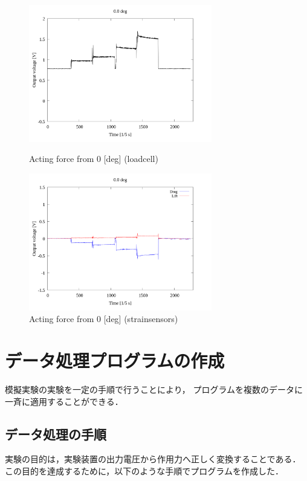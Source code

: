 \documentclass[twocolumn,a4j]{jsarticle}
\begin{document}
\begin{figure}[htbp]
    \footnotesize
    \begin{center}
        \includegraphics[width=80mm]{../images_2/01-1_loadcell/01_loadcell_0.png}
        \caption{Acting force from 0 [deg] (loadcell)}
        \includegraphics[width=80mm]{../images_2/01-2_strainsensors/01_strainsensors_0.png}
        \caption{Acting force from 0 [deg] (strainsensors)}
    \end{center}
\end{figure}

\section{データ処理プログラムの作成}
模擬実験の実験を一定の手順で行うことにより，
プログラムを複数のデータに一斉に適用することができる．\\

\subsection{データ処理の手順}
実験の目的は，実験装置の出力電圧から作用力へ正しく変換することである．
この目的を達成するために，以下のような手順でプログラムを作成した．
\end{document}
